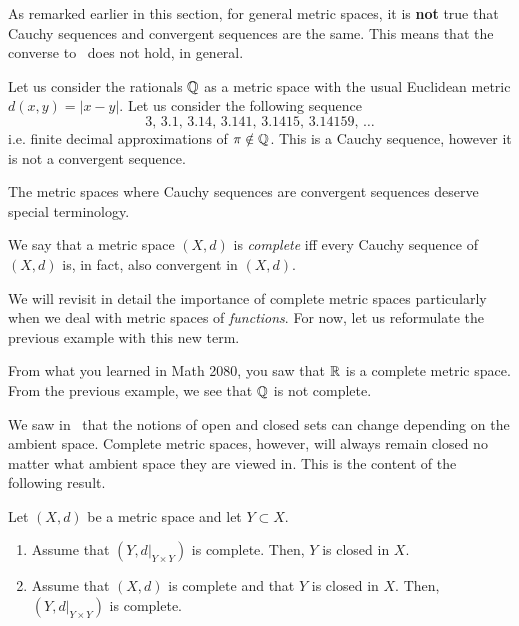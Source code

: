 As remarked earlier in this section, for general metric spaces, it is \textbf{not} true that Cauchy sequences and convergent sequences are the same. This means that the converse to~ does not hold, in general.
\begin{eg}
Let us consider the rationals $\mathbb{Q}$ as a metric space with the usual Euclidean metric $d(x,y) = |x-y|$. Let us consider the following sequence
\[
3,\, 3.1, \, 3.14, \, 3.141, \, 3.1415, \, 3.14159,\, \dots
\]
i.e. finite decimal approximations of $\pi\notin \mathbb{Q}$. This is a Cauchy sequence, however it is not a convergent sequence.
\end{eg}
The metric spaces where Cauchy sequences are convergent sequences deserve special terminology.
\begin{defn}
\label{defn:complete}
We say that a metric space $(X,d)$ is \textit{complete} iff every Cauchy sequence of $(X,d)$ is, in fact, also convergent in $(X,d)$.
\end{defn}
We will revisit in detail the importance of complete metric spaces particularly when we deal with metric spaces of \textit{functions}. For now, let us reformulate the previous example with this new term.
\begin{eg}
From what you learned in Math 2080, you saw that $\mathbb{R}$ is a complete metric space. From the previous example, we see that $\mathbb{Q}$ is not complete.
\end{eg}
We saw in~ that the notions of open and closed sets can change depending on the ambient space. Complete metric spaces, however, will always remain closed no matter what ambient space they are viewed in. This is the content of the following result.
\begin{prop}
\label{prop:comp_clos}
Let $(X,d)$ be a metric space and let $Y\subset X$.
\begin{enumerate}
	\item \label{comp_clos_1} Assume that $(Y,d|_{Y\times Y})$ is complete. Then, $Y$ is closed in $X$.
	\item \label{comp_clos_2} Assume that $(X,d)$ is complete and that $Y$ is closed in $X$. Then, $(Y,d|_{Y\times Y})$ is complete.
\end{enumerate}
\end{prop}
